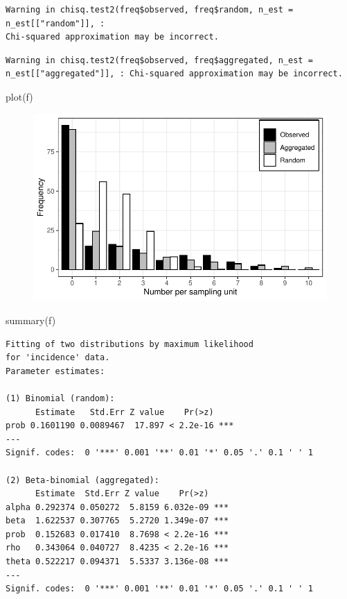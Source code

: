 \documentclass[
  letterpaper,
  DIV=11,
  numbers=noendperiod]{scrreprt}
\newenvironment{Shaded}{\begin{snugshade}}{\end{snugshade}}
\newcommand{\FunctionTok}[1]{\textcolor[rgb]{0.28,0.35,0.67}{#1}}
\newcommand{\NormalTok}[1]{\textcolor[rgb]{0.00,0.23,0.31}{#1}}
\begin{document}
\begin{verbatim}
Warning in chisq.test2(freq$observed, freq$random, n_est = n_est[["random"]], :
Chi-squared approximation may be incorrect.
\end{verbatim}

\begin{verbatim}
Warning in chisq.test2(freq$observed, freq$aggregated, n_est =
n_est[["aggregated"]], : Chi-squared approximation may be incorrect.
\end{verbatim}

\begin{Shaded}
\begin{Highlighting}[]
\FunctionTok{plot}\NormalTok{(f)}
\end{Highlighting}
\end{Shaded}

\begin{figure}[H]

{\centering \includegraphics{./spatial-tests_files/figure-pdf/unnamed-chunk-104-1.pdf}

}

\end{figure}

\begin{Shaded}
\begin{Highlighting}[]
\FunctionTok{summary}\NormalTok{(f)}
\end{Highlighting}
\end{Shaded}

\begin{verbatim}
Fitting of two distributions by maximum likelihood
for 'incidence' data.
Parameter estimates:

(1) Binomial (random):
      Estimate   Std.Err Z value    Pr(>z)    
prob 0.1601190 0.0089467  17.897 < 2.2e-16 ***
---
Signif. codes:  0 '***' 0.001 '**' 0.01 '*' 0.05 '.' 0.1 ' ' 1

(2) Beta-binomial (aggregated):
      Estimate  Std.Err Z value    Pr(>z)    
alpha 0.292374 0.050272  5.8159 6.032e-09 ***
beta  1.622537 0.307765  5.2720 1.349e-07 ***
prob  0.152683 0.017410  8.7698 < 2.2e-16 ***
rho   0.343064 0.040727  8.4235 < 2.2e-16 ***
theta 0.522217 0.094371  5.5337 3.136e-08 ***
---
Signif. codes:  0 '***' 0.001 '**' 0.01 '*' 0.05 '.' 0.1 ' ' 1
\end{verbatim}
\end{document}
